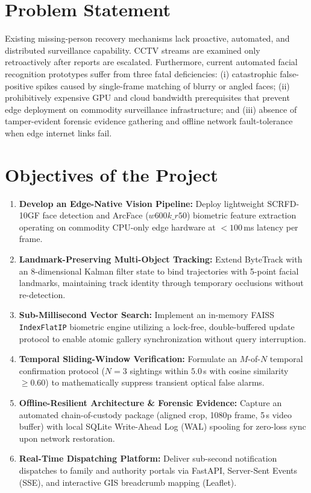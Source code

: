 \documentclass[10pt, a4paper]{article}
\begin{document}
\section{Problem Statement}
Existing missing-person recovery mechanisms lack proactive, automated, and distributed surveillance capability. CCTV streams are examined only retroactively after reports are escalated. Furthermore, current automated facial recognition prototypes suffer from three fatal deficiencies: (i) catastrophic false-positive spikes caused by single-frame matching of blurry or angled faces; (ii) prohibitively expensive GPU and cloud bandwidth prerequisites that prevent edge deployment on commodity surveillance infrastructure; and (iii) absence of tamper-evident forensic evidence gathering and offline network fault-tolerance when edge internet links fail.

\section{Objectives of the Project}
\begin{enumerate}
    \item \textbf{Develop an Edge-Native Vision Pipeline:} Deploy lightweight SCRFD-10GF face detection and ArcFace ($w600k\_r50$) biometric feature extraction operating on commodity CPU-only edge hardware at $<100$\,ms latency per frame.
    \item \textbf{Landmark-Preserving Multi-Object Tracking:} Extend ByteTrack with an 8-dimensional Kalman filter state to bind trajectories with 5-point facial landmarks, maintaining track identity through temporary occlusions without re-detection.
    \item \textbf{Sub-Millisecond Vector Search:} Implement an in-memory FAISS \texttt{IndexFlatIP} biometric engine utilizing a lock-free, double-buffered update protocol to enable atomic gallery synchronization without query interruption.
    \item \textbf{Temporal Sliding-Window Verification:} Formulate an $M$-of-$N$ temporal confirmation protocol ($N=3$ sightings within $5.0$\,s with cosine similarity $\ge 0.60$) to mathematically suppress transient optical false alarms.
    \item \textbf{Offline-Resilient Architecture \& Forensic Evidence:} Capture an automated chain-of-custody package (aligned crop, 1080p frame, 5\,s video buffer) with local SQLite Write-Ahead Log (WAL) spooling for zero-loss sync upon network restoration.
    \item \textbf{Real-Time Dispatching Platform:} Deliver sub-second notification dispatches to family and authority portals via FastAPI, Server-Sent Events (SSE), and interactive GIS breadcrumb mapping (Leaflet).
\end{enumerate}
\end{document}
